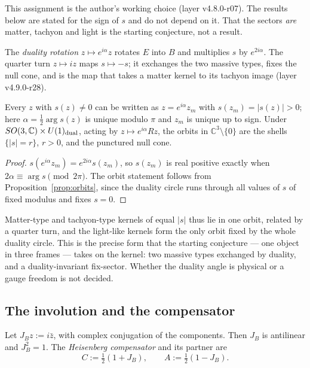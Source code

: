 This assignment is the author's working choice (layer v4.8.0-r07).  The results below are stated for the sign of \(s\) and do
not depend on it.  That the sectors \emph{are} matter, tachyon and light is the starting conjecture, not a result.

The \emph{duality rotation} \(z\mapsto e^{i\alpha}z\) rotates \(E\) into \(B\) and multiplies \(s\) by \(e^{2i\alpha}\).  The
quarter turn \(z\mapsto iz\) maps \(s\mapsto-s\); it exchanges the two massive types, fixes the null cone, and is the map that
takes a matter kernel to its tachyon image (layer v4.9.0-r28).

\begin{proposition}\label{prop:duality}
Every \(z\) with \(s(z)\neq0\) can be written as \(z=e^{i\alpha}z_m\) with \(s(z_m)=|s(z)|>0\); here
\(\alpha=\tfrac12\arg s(z)\) is unique modulo \(\pi\) and \(z_m\) is unique up to sign.  Under
\(SO(3,\mathbb C)\times U(1)_{\rm dual}\), acting by \(z\mapsto e^{i\alpha}Rz\), the orbits in \(\mathbb C^3\setminus\{0\}\) are
the shells \(\{|s|=r\}\), \(r>0\), and the punctured null cone.
\end{proposition}

\begin{proof}
\(s(e^{i\alpha}z_m)=e^{2i\alpha}s(z_m)\), so \(s(z_m)\) is real positive exactly when \(2\alpha\equiv\arg s\pmod{2\pi}\).  The
orbit statement follows from Proposition~\ref{prop:orbits}, since the duality circle runs through all values of \(s\) of fixed
modulus and fixes \(s=0\).
\end{proof}

Matter-type and tachyon-type kernels of equal \(|s|\) thus lie in one orbit, related by a quarter turn, and the light-like
kernels form the only orbit fixed by the whole duality circle.  This is the precise form that the starting conjecture --- one
object in three frames --- takes on the kernel: two massive types exchanged by duality, and a duality-invariant fix-sector.
Whether the duality angle is physical or a gauge freedom is not decided.

\subsection{The involution and the compensator}

\begin{definition}\label{def:compensator}
Let \(J_B z:=i\bar z\), with complex conjugation of the components.  Then \(J_B\) is antilinear and \(J_B^2=1\).  The
\emph{Heisenberg compensator} and its partner are
\[
C:=\tfrac12(1+J_B),\qquad A:=\tfrac12(1-J_B).
\]
\end{definition}

